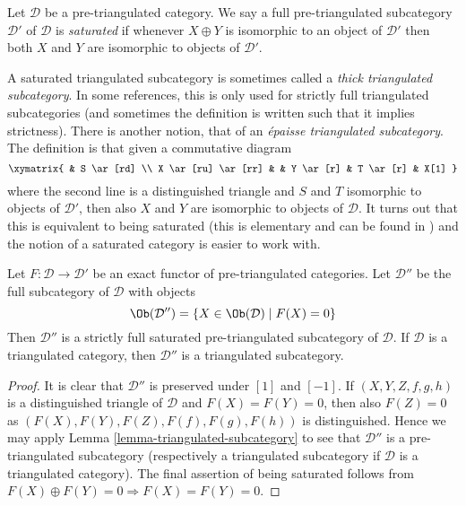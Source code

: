 \begin{definition}
\label{definition-saturated}
Let $\mathcal{D}$ be a pre-triangulated category. We say a full
pre-triangulated subcategory $\mathcal{D}'$ of $\mathcal{D}$ is
{\it saturated} if whenever $X \oplus Y$ is isomorphic to an object
of $\mathcal{D}'$ then both $X$ and $Y$ are isomorphic to objects
of $\mathcal{D}'$.
\end{definition}

\noindent
A saturated triangulated subcategory is sometimes called a
{\it thick triangulated subcategory}. In some references, this is
only used for strictly full triangulated subcategories (and sometimes
the definition is written such that it implies strictness).
There is another notion, that of an {\it \'epaisse triangulated
subcategory}. The definition is that given a commutative diagram
$$
\xymatrix{
& S \ar[rd] \\
X \ar[ru] \ar[rr] & & Y \ar[r] & T \ar[r] & X[1]
}
$$
where the second line is a distinguished triangle and $S$ and $T$ isomorphic
to objects of $\mathcal{D}'$, then also $X$ and $Y$ are isomorphic to objects
of $\mathcal{D}$. It turns out that this is equivalent to being
saturated (this is elementary and can be found in \cite{Rickard-derived})
and the notion of a saturated category is easier to work with.

\begin{lemma}
\label{lemma-triangle-functor-kernel}
Let $F : \mathcal{D} \to \mathcal{D}'$ be an exact functor of
pre-triangulated categories. Let $\mathcal{D}''$ be the full subcategory
of $\mathcal{D}$ with objects
$$
\Ob(\mathcal{D}'') =
\{X \in \Ob(\mathcal{D}) \mid F(X) = 0\}
$$
Then $\mathcal{D}''$ is a strictly full saturated pre-triangulated
subcategory of $\mathcal{D}$. If $\mathcal{D}$ is a triangulated category,
then $\mathcal{D}''$ is a triangulated subcategory.
\end{lemma}

\begin{proof}
It is clear that $\mathcal{D}''$ is preserved under $[1]$ and $[-1]$.
If $(X, Y, Z, f, g, h)$ is a distinguished triangle of $\mathcal{D}$
and $F(X) = F(Y) = 0$, then also $F(Z) = 0$ as
$(F(X), F(Y), F(Z), F(f), F(g), F(h))$ is distinguished.
Hence we may apply
Lemma \ref{lemma-triangulated-subcategory}
to see that $\mathcal{D}''$ is a pre-triangulated subcategory (respectively
a triangulated subcategory if $\mathcal{D}$ is a triangulated category).
The final assertion of being saturated follows from
$F(X) \oplus F(Y) = 0 \Rightarrow F(X) = F(Y) = 0$.
\end{proof}

